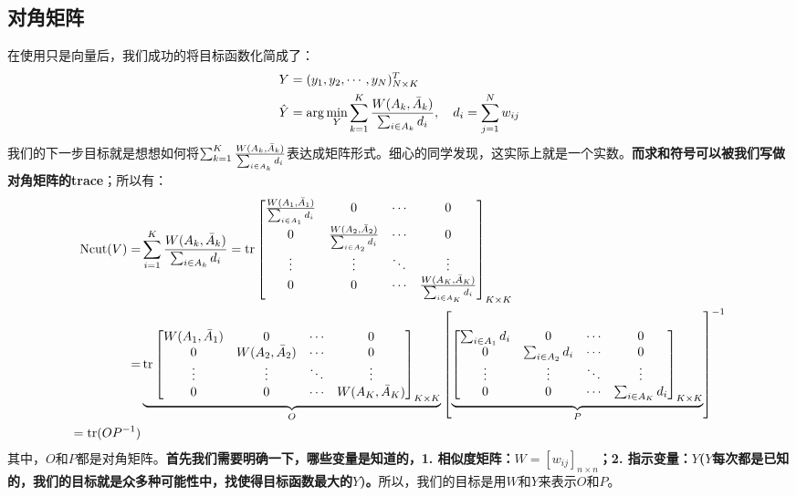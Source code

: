 \documentclass[a4paper]{article}
\begin{document}
\subsection{对角矩阵}
在使用只是向量后，我们成功的将目标函数化简成了：
\begin{equation}
    \begin{split}
        & Y = (y_1,y_2,\cdots,y_N)^T_{N\times K} \\
        & \hat{Y} = \arg\min_{Y} \sum_{k=1}^K \frac{ W(A_k,\Bar{A}_k)}{\sum_{i\in A_k} d_i },\quad d_i = \sum_{j=1}^N w_{ij} 
    \end{split}
\end{equation}
我们的下一步目标就是想想如何将$\sum_{k=1}^K \frac{ W(A_k,\Bar{A}_k)}{\sum_{i\in A_k} d_i } $表达成矩阵形式。细心的同学发现，这实际上就是一个实数。\textbf{而求和符号可以被我们写做对角矩阵的trace}；所以有：
\begin{equation}
\begin{split}
    \mathrm{Ncut}(V) = & \sum_{i=1}^K \frac{ W(A_k,\Bar{A}_k)}{\sum_{i\in A_k} d_i } = \mathrm{tr}
    \begin{bmatrix}
    \frac{ W(A_1,\Bar{A}_1)}{\sum_{i\in A_1} d_i } & 0 & \cdots & 0 \\
    0 & \frac{ W(A_2,\Bar{A}_2)}{\sum_{i\in A_2} d_i } &   \cdots & 0 \\
    \vdots & \vdots & \ddots & \vdots \\
    0 & 0  &   \cdots & \frac{ W(A_K,\Bar{A}_K)}{\sum_{i\in A_K} d_i } \\
    \end{bmatrix}_{K\times K} \\
    = & 
    \underbrace{\mathrm{tr}
    \begin{bmatrix}
    { W(A_1,\Bar{A}_1)} & 0 & \cdots & 0 \\
    0 &  W(A_2,\Bar{A}_2) &   \cdots & 0 \\
    \vdots & \vdots & \ddots & \vdots \\
    0 & 0  &   \cdots & { W(A_K,\Bar{A}_K)} \\
    \end{bmatrix}_{K\times K}}_{O}
    \left[\underbrace{\begin{bmatrix}
    {\sum_{i\in A_1} d_i } & 0 & \cdots & 0 \\
    0 & {\sum_{i\in A_2} d_i } &   \cdots & 0 \\
    \vdots & \vdots & \ddots & \vdots \\
    0 & 0  &   \cdots & {\sum_{i\in A_K} d_i } \\
    \end{bmatrix}_{K\times K}}_{P}\right]^{-1}
    \\
    = \mathrm{tr}(OP^{-1})
\end{split}
\end{equation}
其中，$O$和$P$都是对角矩阵。\textbf{首先我们需要明确一下，哪些变量是知道的，1. 相似度矩阵：$W=[w_{ij}]_{n\times n}$；2. 指示变量：$Y$($Y$每次都是已知的，我们的目标就是众多种可能性中，找使得目标函数最大的$Y$)。}{\color{red}所以，我们的目标是用$W$和$Y$来表示$O$和$P$。}
\end{document}
